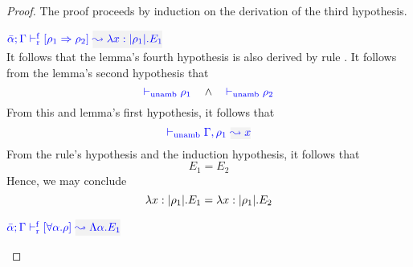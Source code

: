 \begin{proof}
The proof proceeds by induction on the derivation of the third hypothesis.
\begin{description}
\setlength{\itemsep}{1em}
\item[\fbox{\rref{R-IAbs}}]
\quad$\drres{\bar{\alpha}}{\tenv}{\rulet_1 \iarrow \rulet_2}{\abs{\relation{x}{|\rulet_1|}}{E_1}}$ \\

It follows that the lemma's fourth hypothesis is also derived by rule
. It follows from the lemma's second hypothesis that 
\begin{equation*}
  {\color{blue}  \vdash_{\mathrm{unamb}}\rho_1}\quad\wedge\quad {\color{blue}  \vdash_{\mathrm{unamb}}\rho_2}
\end{equation*}
From this and lemma's first hypothesis, it follows that
\begin{equation*}
  \unambig{}{\tenv,\ie{\rulet_1}{x}}
\end{equation*}
From the rule's hypothesis and the induction hypothesis, it follows that
\begin{equation*}
  E_1 = E_2
\end{equation*}
Hence, we may conclude
\begin{equation*}
  \lambda x:|\rho_1|. E_1 =  \lambda x:|\rho_1|. E_2
\end{equation*}

\item[\fbox{\rref{R-TAbs}}]\quad$\drres{\bar{\alpha}}{\tenv}{\tall{\alpha}{\rulet}}{\Abs{\alpha}{E_1}}$ \\


\end{description}
\end{proof}
